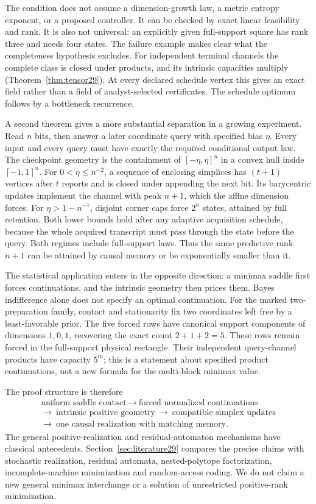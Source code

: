\documentclass[11pt]{amsart}
\theoremstyle{definition}\newtheorem{definition}[theorem]{Definition}
\theoremstyle{remark}\newtheorem{remark}[theorem]{Remark}
\newcommand{\1}{\mathbf 1}
\begin{document}
The condition does not assume a dimension-growth law, a metric entropy
exponent, or a proposed controller. It can be checked by exact linear
feasibility and rank. It is also not universal: an explicitly given
full-support square has rank three and needs four states. The failure
example makes clear what the completeness hypothesis excludes.
For independent terminal channels the complete class is closed under
products, and its intrinsic capacities multiply
(Theorem~\ref{thm:tensor29}). At every declared schedule vertex this
gives an exact field rather than a field of analyst-selected
certificates. The schedule optimum follows by a bottleneck recurrence.

A second theorem gives a more substantial separation in a growing
experiment. Read $n$ bits, then answer a later coordinate query with
specified bias $\eta$. Every input and every query must have exactly
the required conditional output law. The checkpoint geometry is the
containment of $[-\eta,\eta]^n$ in a convex hull inside $[-1,1]^n$.
For $0<\eta\le n^{-2}$, a sequence of enclosing simplices has
$(t+1)$ vertices after $t$ reports and is closed under appending the
next bit. Its barycentric updates implement the channel with peak
$n+1$, which the affine dimension forces. For $\eta>1-n^{-1}$,
disjoint corner caps force $2^n$ states, attained by full retention.
Both lower bounds hold after any adaptive acquisition schedule,
because the whole acquired transcript must pass through the state
before the query. Both regimes include full-support laws. Thus the
same predictive rank $n+1$ can be attained by causal memory or be
exponentially smaller than it.

The statistical application enters in the opposite direction: a
minimax saddle first forces continuations, and the intrinsic geometry
then prices them. Bayes indifference alone does not specify an optimal
continuation. For the marked two-preparation family, contact and
stationarity fix two coordinates left free by a least-favorable prior.
The five forced rows have canonical support components of dimensions
$1,0,1$, recovering the exact count $2+1+2=5$. These rows remain forced
in the full-support physical rectangle. Their independent query-channel
products have capacity $5^m$; this is a statement about specified
product continuations, not a new formula for the multi-block minimax
value.

The proof structure is therefore
\[
\begin{gathered}
 \text{uniform saddle contact}
 \ \longrightarrow\ \text{forced normalized continuations}\\
 \longrightarrow\ \text{intrinsic positive geometry}
 \ \longrightarrow\ \text{compatible simplex updates}\\
 \longrightarrow\ \text{one causal realization with matching memory}.
\end{gathered}
\]
The general positive-realization and residual-automaton mechanisms have
classical antecedents. Section~\ref{sec:literature29} compares the
precise claims with stochastic realization, residual automata,
nested-polytope factorization, incomplete-machine minimization and
random-access coding. We do not claim a new general minimax interchange
or a solution of unrestricted positive-rank minimization.
\end{document}

